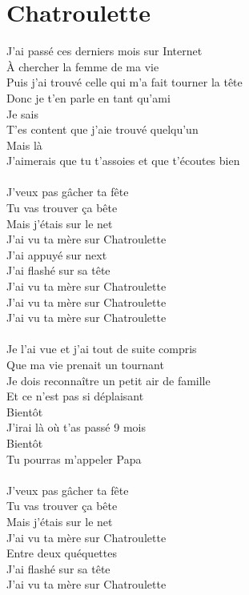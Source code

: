 \section*{Chatroulette}
J'ai passé ces derniers mois sur Internet\\
À chercher la femme de ma vie\\
Puis j'ai trouvé celle qui m'a fait tourner la tête\\
Donc je t'en parle en tant qu'ami\\
Je sais\\
T'es content que j'aie trouvé quelqu'un\\
Mais là\\
J'aimerais que tu t'assoies et que t'écoutes bien\\\\
J'veux pas gâcher ta fête\\
Tu vas trouver ça bête\\
Mais j'étais sur le net\\
J'ai vu ta mère sur Chatroulette\\
J'ai appuyé sur next\\
J'ai flashé sur sa tête\\
J'ai vu ta mère sur Chatroulette\\
J'ai vu ta mère sur Chatroulette\\
J'ai vu ta mère sur Chatroulette\\\\
Je l'ai vue et j'ai tout de suite compris\\
Que ma vie prenait un tournant\\
Je dois reconnaître un petit air de famille\\
Et ce n'est pas si déplaisant\\
Bientôt\\
J'irai là où t'as passé 9 mois\\
Bientôt\\
Tu pourras m'appeler Papa\\\\
J'veux pas gâcher ta fête\\
Tu vas trouver ça bête\\
Mais j'étais sur le net\\
J'ai vu ta mère sur Chatroulette\\
Entre deux quéquettes\\
J'ai flashé sur sa tête\\
J'ai vu ta mère sur Chatroulette\\
